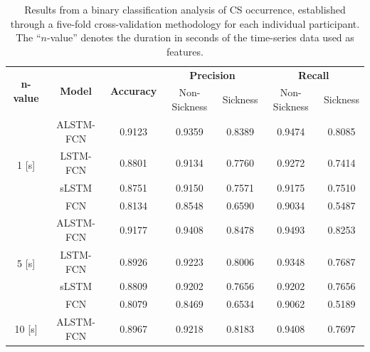 \documentclass{ieeeaccess}
\begin{document}
\begin{table}[htbp!]
\caption{Results from a binary classification analysis of CS occurrence, established through a five-fold cross-validation methodology for each individual participant. The “$n$-value” denotes the duration in seconds of the time-series data used as features.}
\label{tab:my-table}
\centering
\begin{tabular*}{0.68\textwidth}{c|c|c|cc|cc}
\hline
\multirow{2}{*}{\textbf{n-value}} &
  \multirow{2}{*}{\textbf{Model}} &
  \multirow{2}{*}{\textbf{Accuracy}} &
  \multicolumn{2}{c|}{\textbf{Precision}} &
  \multicolumn{2}{c}{\textbf{Recall}}\\ \cline{4-7} 
                            &           &        & \multicolumn{1}{c|}{Non-Sickness} & Sickness & \multicolumn{1}{c|}{Non-Sickness} & Sickness \\ \hline
\multirow{4}{*}{1   [s]}  & ALSTM-FCN & 0.9123 & \multicolumn{1}{c|}{0.9359}       & 0.8389   & \multicolumn{1}{c|}{0.9474}       & 0.8085   \\ \cline{2-7} 
                            & LSTM-FCN  & 0.8801 & \multicolumn{1}{c|}{0.9134}       & 0.7760   & \multicolumn{1}{c|}{0.9272}       & 0.7414   \\ \cline{2-7} 
                            & sLSTM      & 0.8751 & \multicolumn{1}{c|}{0.9150}       & 0.7571   & \multicolumn{1}{c|}{0.9175}       & 0.7510   \\ \cline{2-7} 
                            & FCN       & 0.8134 & \multicolumn{1}{c|}{0.8548}       & 0.6590   & \multicolumn{1}{c|}{0.9034}       & 0.5487   \\ \hline
\multirow{4}{*}{5   [s]}  & ALSTM-FCN & 0.9177 & \multicolumn{1}{c|}{0.9408}       & 0.8478   & \multicolumn{1}{c|}{0.9493}       & 0.8253   \\ \cline{2-7} 
                            & LSTM-FCN  & 0.8926 & \multicolumn{1}{c|}{0.9223}       & 0.8006   & \multicolumn{1}{c|}{0.9348}       & 0.7687   \\ \cline{2-7} 
                            & sLSTM      & 0.8809 & \multicolumn{1}{c|}{0.9202}       & 0.7656   & \multicolumn{1}{c|}{0.9202}       & 0.7656   \\ \cline{2-7} 
                            & FCN       & 0.8079 & \multicolumn{1}{c|}{0.8469}       & 0.6534   & \multicolumn{1}{c|}{0.9062}       & 0.5189   \\ \hline
\multirow{4}{*}{10   [s]} & ALSTM-FCN & 0.8967 & \multicolumn{1}{c|}{0.9218}       & 0.8183   & \multicolumn{1}{c|}{0.9408}       & 0.7697   \\ \cline{2-7} 

\end{tabular*}
\end{table}
\end{document}
